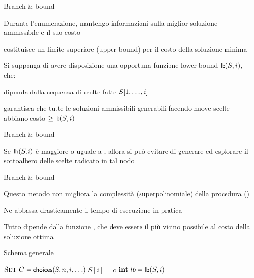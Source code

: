 \begin{frame}{Branch-\&-bound}

\BIL
\item Durante l'enumerazione, mantengo informazioni sulla miglior
soluzione ammissibile \Minsol e il suo costo \Mincost
\item \Mincost costituisce un \alert{limite superiore} (\alert{upper bound})
per il costo della soluzione minima
\EIL

\BIL
\item Si supponga di avere disposizione una opportuna funzione \alert{lower bound} $\textsf{{\small lb}}(S, i)$, che:
  \BI 
  \item dipenda dalla sequenza di scelte fatte $S[1, \ldots,i]$
  \item garantisca che tutte le soluzioni ammissibili generabili facendo
nuove scelte abbiano costo $\geq \textsf{{\small lb}}(S, i)$
  \EI
\EIL
    
\end{frame}

\begin{frame}{Branch-\&-bound}

\vspace{-9pt}
\begin{myboxtitle}[Potatura]
Se $\textsf{{\small lb}}(S, i)$ è maggiore o uguale a \Mincost, allora si può
evitare di generare ed esplorare il sottoalbero delle scelte radicato in tal
nodo
\end{myboxtitle}

\end{frame}

\begin{frame}{Branch-\&-bound}

\BIL
\item Questo metodo non migliora la complessità (superpolinomiale) della procedura \enumerazione()
\item Ne abbassa drasticamente il tempo di esecuzione in pratica
\item Tutto dipende dalla funzione \LB, che deve essere il più vicino possibile al costo della soluzione ottima
\EIL

\end{frame}

\begin{frame}{Schema generale}

\vspace{-12pt}
\begin{Procedure}
\caption[A]{\branchbound($\Item[\,]\ S$, \INTEGER $n$, \INTEGER\ $i$, \mldots)}
$\textsc{Set}\ C = \textsf{{\small choices}}(S, n, i, \ldots)$
{
  $S[i] = c$\;
  $\INTEGER\ lb = \LB(S, i)$\;
}
\end{Procedure}

\end{frame}

